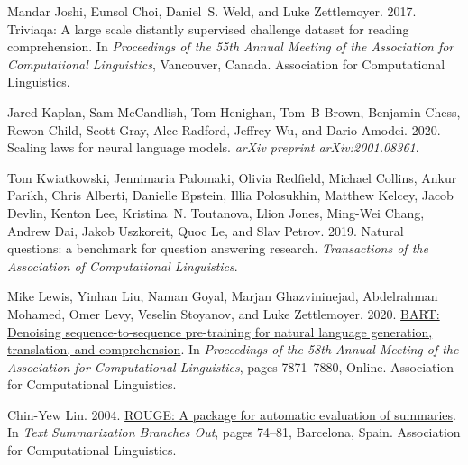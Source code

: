 \documentclass[11pt]{article}
\begin{document}
\begin{thebibliography}{43}
Mandar Joshi, Eunsol Choi, Daniel~S. Weld, and Luke Zettlemoyer. 2017.
\newblock Triviaqa: A large scale distantly supervised challenge dataset for
  reading comprehension.
\newblock In \emph{Proceedings of the 55th Annual Meeting of the Association
  for Computational Linguistics}, Vancouver, Canada. Association for
  Computational Linguistics.

Jared Kaplan, Sam McCandlish, Tom Henighan, Tom~B Brown, Benjamin Chess, Rewon
  Child, Scott Gray, Alec Radford, Jeffrey Wu, and Dario Amodei. 2020.
\newblock Scaling laws for neural language models.
\newblock \emph{arXiv preprint arXiv:2001.08361}.

Tom Kwiatkowski, Jennimaria Palomaki, Olivia Redfield, Michael Collins, Ankur
  Parikh, Chris Alberti, Danielle Epstein, Illia Polosukhin, Matthew Kelcey,
  Jacob Devlin, Kenton Lee, Kristina~N. Toutanova, Llion Jones, Ming-Wei Chang,
  Andrew Dai, Jakob Uszkoreit, Quoc Le, and Slav Petrov. 2019.
\newblock Natural questions: a benchmark for question answering research.
\newblock \emph{Transactions of the Association of Computational Linguistics}.

Mike Lewis, Yinhan Liu, Naman Goyal, Marjan Ghazvininejad, Abdelrahman Mohamed,
  Omer Levy, Veselin Stoyanov, and Luke Zettlemoyer. 2020.
\newblock \href {https://doi.org/10.18653/v1/2020.acl-main.703} {{BART}:
  Denoising sequence-to-sequence pre-training for natural language generation,
  translation, and comprehension}.
\newblock In \emph{Proceedings of the 58th Annual Meeting of the Association
  for Computational Linguistics}, pages 7871--7880, Online. Association for
  Computational Linguistics.

Chin-Yew Lin. 2004.
\newblock \href {https://aclanthology.org/W04-1013} {{ROUGE}: A package for
  automatic evaluation of summaries}.
\newblock In \emph{Text Summarization Branches Out}, pages 74--81, Barcelona,
  Spain. Association for Computational Linguistics.


\end{thebibliography}
\end{document}
